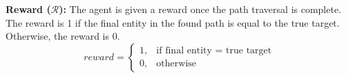 \noindent\textbf{Reward ($\mathcal{R}$): }
The agent is given a reward once the path traversal is complete. The reward is 1 if the final entity in the found path is equal to the true target.
Otherwise, the reward is 0.
\[
    reward = 
\begin{cases}
    1,& \text{if final entity = true target}\\
    0,              & \text{otherwise}
\end{cases}
\]

